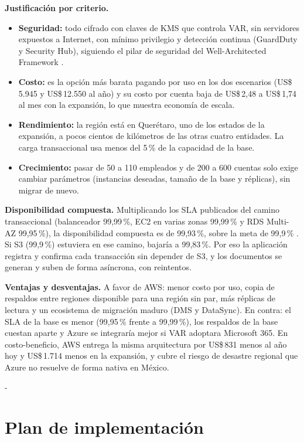 \documentclass[11pt,letterpaper]{article}
\makeatletter
\newcommand{\needspace}[1]{\par\penalty-100\begingroup\setlength{\dimen@}{#1}%
  \dimen@ii\pagegoal\advance\dimen@ii-\pagetotal
  \ifdim\dimen@>\dimen@ii\ifdim\dimen@ii>\z@\vfil\fi\break\fi\endgroup}
\newcommand{\usd}[1]{US\$\,#1}
\makeatother
\begin{document}
\textbf{Justificación por criterio.}
\begin{itemize}
  \item \textbf{Seguridad:} todo cifrado con claves de KMS que controla VAR, sin servidores expuestos a Internet, con mínimo privilegio y detección continua (GuardDuty y Security Hub), siguiendo el pilar de seguridad del Well-Architected Framework \parencite{aws-waf}.
  \item \textbf{Costo:} es la opción más barata pagando por uso en los dos escenarios (\usd{5.945} y \usd{12.550} al año) y su costo por cuenta baja de \usd{2,48} a \usd{1,74} al mes con la expansión, lo que muestra economía de escala.
  \item \textbf{Rendimiento:} la región está en Querétaro, uno de los estados de la expansión, a pocos cientos de kilómetros de las otras cuatro entidades. La carga transaccional usa menos del 5\,\% de la capacidad de la base.
  \item \textbf{Crecimiento:} pasar de 50 a 110 empleados y de 200 a 600 cuentas solo exige cambiar parámetros (instancias deseadas, tamaño de la base y réplicas), sin migrar de nuevo.
\end{itemize}

\textbf{Disponibilidad compuesta.} Multiplicando los SLA publicados del camino transaccional (balanceador 99,99\,\%, EC2 en varias zonas 99,99\,\% y RDS Multi-AZ 99,95\,\%), la disponibilidad compuesta es de 99,93\,\%, sobre la meta de 99,9\,\% \parencite{aws-sla-elb,aws-sla-compute,aws-sla-rds}. Si S3 (99,9\,\%) estuviera en ese camino, bajaría a 99,83\,\%. Por eso la aplicación registra y confirma cada transacción sin depender de S3, y los documentos se generan y suben de forma asíncrona, con reintentos.

\textbf{Ventajas y desventajas.} A favor de AWS: menor costo por uso, copia de respaldos entre regiones disponible para una región sin par, más réplicas de lectura y un ecosistema de migración maduro (DMS y DataSync). En contra: el SLA de la base es menor (99,95\,\% frente a 99,99\,\%), los respaldos de la base cuestan aparte y Azure se integraría mejor si VAR adoptara Microsoft 365. En costo-beneficio, AWS entrega la misma arquitectura por \usd{831} menos al año hoy y \usd{1.714} menos en la expansión, y cubre el riesgo de desastre regional que Azure no resuelve de forma nativa en México.

\needspace{8\baselineskip}
\section{Plan de implementación}\label{sec:implementacion}
\end{document}
